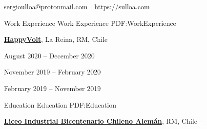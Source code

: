 \documentclass[letterpaper,yyyy,draft]{simpleresumecv}
\newcommand{\CVAuthor}{Sergio A. Ulloa B.}
\newcommand{\CVWebpage}{https://sulloa.com}
\begin{document}
\makeatletter
\let\@oddfoot\@empty{}
\let\@evenfoot\@empty{}
\makeatother

\Title{\CVAuthor}

{
    \begin{SubTitle}
    \href{mailto:sergioulloa@protonmail.com}{sergioulloa@protonmail.com}
    \,\SubBulletSymbol\,
    \href{\CVWebpage}{\url{\CVWebpage}}
    \end{SubTitle}
}

\begin{Body}


\Section
{Work\newline
Experience}
{Work Experience}
{PDF:WorkExperience}
{
    \Entry{}
    \href{https://happyvolt.com/}{\textbf{HappyVolt}},
    La Reina, RM, Chile

    \hfill
    August 2020 -- December 2020

    \hfill
    November 2019 -- February 2020

    \hfill
    February 2019 -- November 2019

    \hfill
    \begin{Detail}


    \end{Detail}


    \begin{Detail}
    \end{Detail}
}


\Section
{Education}
{Education}
{PDF:Education}
{
    \Entry{}
    \href{https://www.lichan.cl/}{\textbf{Liceo Industrial Bicentenario Chileno Alemán}},
    RM, Chile
    \hfill
     -- 

}
\end{Body}
\end{document}
